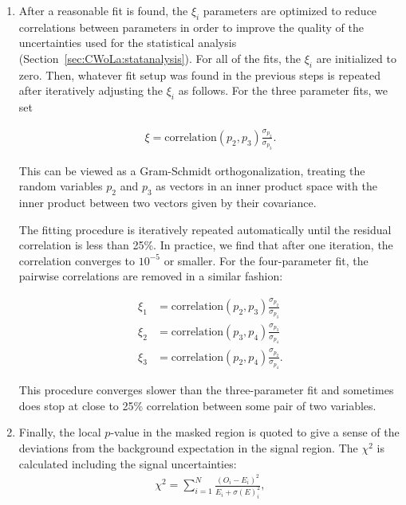 \begin{enumerate}
\item \label{fitstep:4} After a reasonable fit is found, the $\xi_i$ parameters are optimized to reduce correlations between parameters in order to improve the quality of the uncertainties used for the statistical analysis (Section~\ref{sec:CWoLa:statanalysis}).  For all of the fits, the $\xi_i$ are initialized to zero.  Then, whatever fit setup was found in the previous steps is repeated after iteratively adjusting the $\xi_i$ as follows.   For the three parameter fits, we set

\begin{align}
\xi=\text{correlation}(p_2,p_3)\frac{\sigma_{p_2}}{\sigma_{p_3}}.
\end{align}

\noindent This can be viewed as a Gram-Schmidt orthogonalization, treating the random variables $p_2$ and $p_3$ as vectors in an inner product space with the inner product between two vectors given by their covariance.

%

\noindent The fitting procedure is iteratively repeated automatically until the residual correlation is less than 25\%.
In practice, we find that after one iteration, the correlation converges to $10^{-5}$ or smaller.
For the four-parameter fit, the pairwise correlations are removed in a similar fashion:

\begin{align}
\xi_1&=\text{correlation}(p_2,p_3)\frac{\sigma_{p_2}}{\sigma_{p_3}}\\
\xi_2&=\text{correlation}(p_3,p_4)\frac{\sigma_{p_3}}{\sigma_{p_4}}\\
\xi_3&=\text{correlation}(p_2,p_4)\frac{\sigma_{p_2}}{\sigma_{p_4}}.
\end{align}

\noindent This procedure converges slower than the three-parameter fit and sometimes does stop at close to 25\% correlation between some pair of two variables.

\item Finally, the local $p$-value in the masked region is quoted to give a sense of the deviations from the background expectation in the signal region.
The $\chi^2$ is calculated including the signal uncertainties:
\begin{align}
  \chi^2=\sum_{i=1}^N \frac{(O_i-E_i)^2}{E_i+\sigma(E)^2_i},
\end{align}


\end{enumerate}

